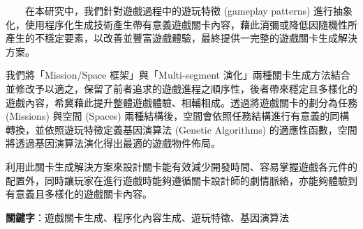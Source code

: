 　　在本研究中，我們針對遊戲過程中的遊玩特徵 (gameplay patterns) 進行抽象化，使用程序化生成技術產生帶有意義遊戲關卡內容，藉此消彌或降低因隨機性所產生的不穩定要素，以改善並豐富遊戲體驗，最終提供一完整的遊戲關卡生成解決方案。

我們將「Mission/Space 框架」與「Multi-segment 演化」兩種關卡生成方法結合並修改予以適之，保留了前者追求的遊戲進程之順序性，後者帶來穩定且多樣化的遊戲內容，希冀藉此提升整體遊戲體驗、相輔相成。透過將遊戲關卡的劃分為任務 (Missions) 與空間 (Spaces) 兩種結構後，空間會依照任務結構進行有意義的同構轉換，並依照遊玩特徵定義基因演算法 (Genetic Algorithms) 的適應性函數，空間將透過基因演算法演化得出最適的遊戲物件佈局。

利用此關卡生成解決方案來設計關卡能有效減少開發時間、容易掌握遊戲各元件的配置外，同時讓玩家在進行遊戲時能夠遵循關卡設計師的劇情脈絡，亦能夠體驗到有意義且多樣化的遊戲關卡內容。

\textbf{關鍵字}：遊戲關卡生成、程序化內容生成、遊玩特徵、基因演算法